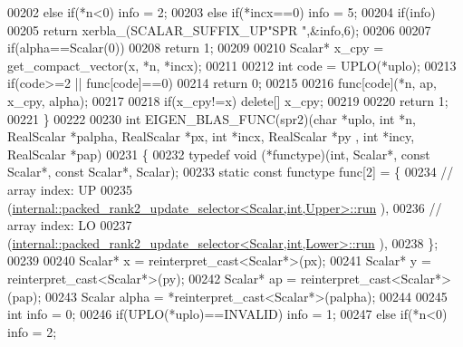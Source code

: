 \begin{DoxyCode}
00202   \textcolor{keywordflow}{else} \textcolor{keywordflow}{if}(*n<0)                                                       info = 2;
00203   \textcolor{keywordflow}{else} \textcolor{keywordflow}{if}(*incx==0)                                                   info = 5;
00204   \textcolor{keywordflow}{if}(info)
00205     \textcolor{keywordflow}{return} xerbla\_(SCALAR\_SUFFIX\_UP\textcolor{stringliteral}{"SPR  "},&info,6);
00206 
00207   \textcolor{keywordflow}{if}(alpha==Scalar(0))
00208     \textcolor{keywordflow}{return} 1;
00209 
00210   Scalar* x\_cpy = get\_compact\_vector(x, *n, *incx);
00211 
00212   \textcolor{keywordtype}{int} code = UPLO(*uplo);
00213   \textcolor{keywordflow}{if}(code>=2 || func[code]==0)
00214     \textcolor{keywordflow}{return} 0;
00215 
00216   func[code](*n, ap, x\_cpy, alpha);
00217 
00218   \textcolor{keywordflow}{if}(x\_cpy!=x)  \textcolor{keyword}{delete}[] x\_cpy;
00219 
00220   \textcolor{keywordflow}{return} 1;
00221 \}
00222 
00230 \textcolor{keywordtype}{int} EIGEN\_BLAS\_FUNC(spr2)(\textcolor{keywordtype}{char} *uplo, \textcolor{keywordtype}{int} *n, RealScalar *palpha, RealScalar *px, \textcolor{keywordtype}{int} *incx, RealScalar *py
      , \textcolor{keywordtype}{int} *incy, RealScalar *pap)
00231 \{
00232   \textcolor{keyword}{typedef} void (*functype)(int, Scalar*, \textcolor{keyword}{const} Scalar*, \textcolor{keyword}{const} Scalar*, Scalar);
00233   \textcolor{keyword}{static} \textcolor{keyword}{const} functype func[2] = \{
00234     \textcolor{comment}{// array index: UP}
00235     (\hyperlink{structinternal_1_1packed__rank2__update__selector}{internal::packed\_rank2\_update\_selector<Scalar,int,Upper>::run}
      ),
00236     \textcolor{comment}{// array index: LO}
00237     (\hyperlink{structinternal_1_1packed__rank2__update__selector}{internal::packed\_rank2\_update\_selector<Scalar,int,Lower>::run}
      ),
00238   \};
00239 
00240   Scalar* x = \textcolor{keyword}{reinterpret\_cast<}Scalar*\textcolor{keyword}{>}(px);
00241   Scalar* y = \textcolor{keyword}{reinterpret\_cast<}Scalar*\textcolor{keyword}{>}(py);
00242   Scalar* ap = \textcolor{keyword}{reinterpret\_cast<}Scalar*\textcolor{keyword}{>}(pap);
00243   Scalar alpha = *\textcolor{keyword}{reinterpret\_cast<}Scalar*\textcolor{keyword}{>}(palpha);
00244 
00245   \textcolor{keywordtype}{int} info = 0;
00246   \textcolor{keywordflow}{if}(UPLO(*uplo)==INVALID)                                            info = 1;
00247   \textcolor{keywordflow}{else} \textcolor{keywordflow}{if}(*n<0)                                                       info = 2;

\end{DoxyCode}
